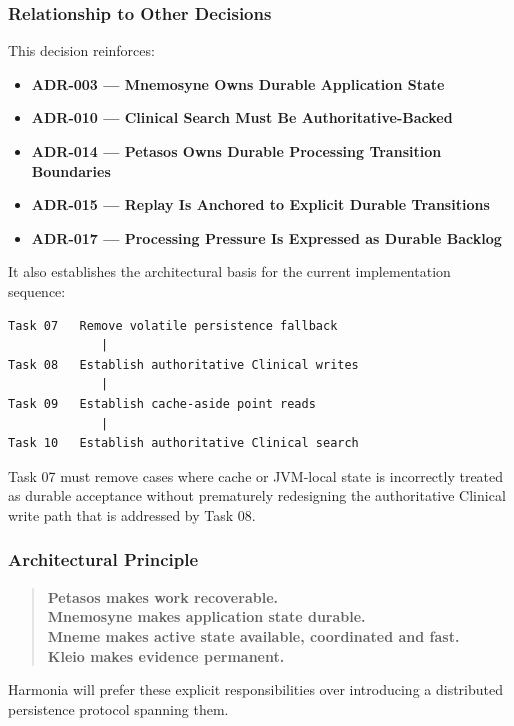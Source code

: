 \subsubsection{Relationship to Other Decisions}

This decision reinforces:
\begin{itemize}
    \item \textbf{ADR-003 --- Mnemosyne Owns Durable Application State}
    \item \textbf{ADR-010 --- Clinical Search Must Be Authoritative-Backed}
    \item \textbf{ADR-014 --- Petasos Owns Durable Processing Transition Boundaries}
    \item \textbf{ADR-015 --- Replay Is Anchored to Explicit Durable Transitions}
    \item \textbf{ADR-017 --- Processing Pressure Is Expressed as Durable Backlog}
\end{itemize}

It also establishes the architectural basis for the current implementation sequence:

\begin{verbatim}
Task 07   Remove volatile persistence fallback
             |
Task 08   Establish authoritative Clinical writes
             |
Task 09   Establish cache-aside point reads
             |
Task 10   Establish authoritative Clinical search
\end{verbatim}

Task 07 must remove cases where cache or JVM-local state is incorrectly treated as durable acceptance without prematurely redesigning the authoritative Clinical write path that is addressed by Task 08.

\subsubsection{Architectural Principle}

\begin{quote}
    \textbf{Petasos makes work recoverable.}\\
    \textbf{Mnemosyne makes application state durable.}\\
    \textbf{Mneme makes active state available, coordinated and fast.}\\
    \textbf{Kleio makes evidence permanent.}
\end{quote}

Harmonia will prefer these explicit responsibilities over introducing a distributed persistence protocol spanning them.

